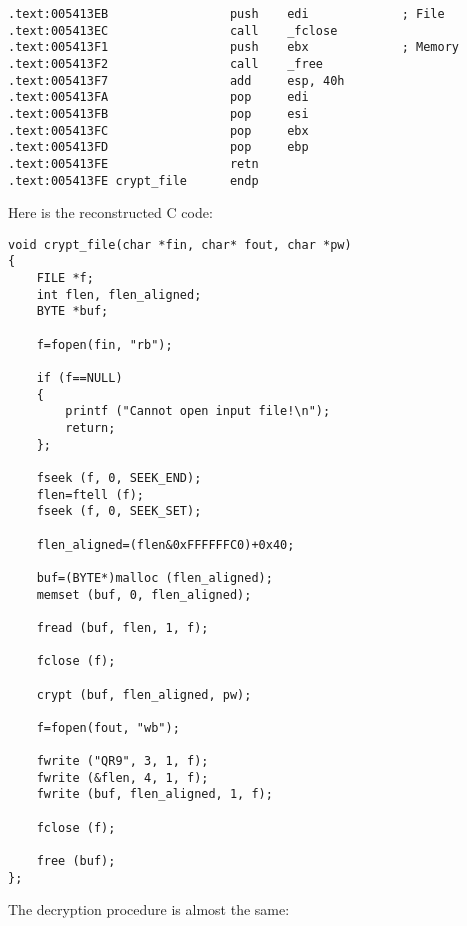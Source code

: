 \begin{lstlisting}[style=customasmx86]
.text:005413EB                 push    edi             ; File
.text:005413EC                 call    _fclose
.text:005413F1                 push    ebx             ; Memory
.text:005413F2                 call    _free
.text:005413F7                 add     esp, 40h
.text:005413FA                 pop     edi
.text:005413FB                 pop     esi
.text:005413FC                 pop     ebx
.text:005413FD                 pop     ebp
.text:005413FE                 retn
.text:005413FE crypt_file      endp
\end{lstlisting}

Here is the reconstructed C code:

\begin{lstlisting}[style=customc]
void crypt_file(char *fin, char* fout, char *pw)
{
	FILE *f;
	int flen, flen_aligned;
	BYTE *buf;

	f=fopen(fin, "rb");
	
	if (f==NULL)
	{
		printf ("Cannot open input file!\n");
		return;
	};

	fseek (f, 0, SEEK_END);
	flen=ftell (f);
	fseek (f, 0, SEEK_SET);

	flen_aligned=(flen&0xFFFFFFC0)+0x40;

	buf=(BYTE*)malloc (flen_aligned);
	memset (buf, 0, flen_aligned);

	fread (buf, flen, 1, f);

	fclose (f);

	crypt (buf, flen_aligned, pw);
	
	f=fopen(fout, "wb");

	fwrite ("QR9", 3, 1, f);
	fwrite (&flen, 4, 1, f);
	fwrite (buf, flen_aligned, 1, f);

	fclose (f);

	free (buf);
};
\end{lstlisting}

The decryption procedure is almost the same:

